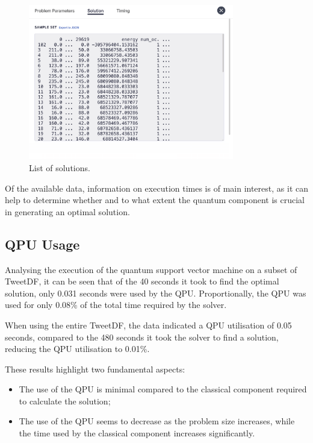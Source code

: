 \begin{figure}
    \centering
    \includegraphics[width=0.8\textwidth]{figures/sampleset.png}
    \caption{List of solutions.}
    \label{fig:sampleset}
\end{figure}

Of the available data, information on execution times is of main interest, as it can help to determine whether and to what extent the quantum component is crucial in generating an optimal solution.

\subsection{QPU Usage}

Analysing the execution of the quantum support vector machine on a subset of TweetDF, it can be seen that of the 40 seconds it took to find the optimal solution, only 0.031 seconds were used by the QPU. Proportionally, the QPU was used for only 0.08\% of the total time required by the solver.

When using the entire TweetDF, the data indicated a QPU utilisation of 0.05 seconds, compared to the 480 seconds it took the solver to find a solution, reducing the QPU utilisation to 0.01\%.

These results highlight two fundamental aspects: 
\begin{itemize} 
	\item The use of the QPU is minimal compared to the classical component required to calculate the solution; 
	\item The use of the QPU seems to decrease as the problem size increases, while the time used by the classical component increases significantly. 
\end{itemize}

